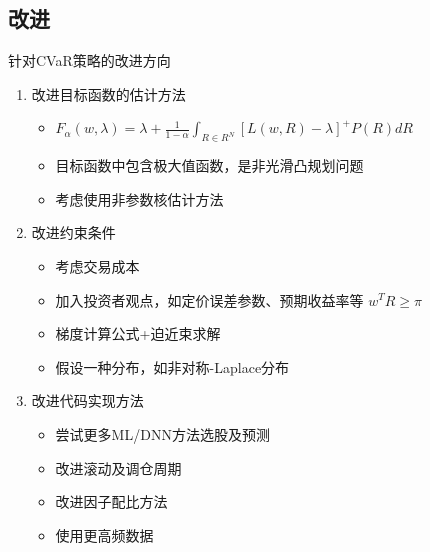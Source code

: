 \documentclass[CJK,aspectratio=43]{beamer}  %
\begin{document}
\subsection{改进}
\begin{frame}{针对CVaR策略的改进方向}
	\begin{enumerate}
		\item 改进目标函数的估计方法
		\begin{itemize}
			\item $F_{\alpha}(w,\lambda)=\lambda+\frac{1}{1-\alpha}\int_{R\in R^N}[L(w,R)-\lambda]^{+}P(R)dR$
			\item 目标函数中包含极大值函数，是非光滑凸规划问题
			\item 考虑使用非参数核估计方法~\cite{Huang2014}
		\end{itemize}
		\item 改进约束条件
		\begin{itemize}
			\item 考虑交易成本
			\item 加入投资者观点，如定价误差参数、预期收益率等 $w^TR\geq \pi$
			\item 梯度计算公式+迫近束求解~\cite{Tong2021}
			\item 假设一种分布，如非对称-Laplace分布~\cite{Huang2022}
		\end{itemize}
		\item  改进代码实现方法
		\begin{itemize}
			\item 尝试更多ML/DNN方法选股及预测
			\item 改进滚动及调仓周期
			\item 改进因子配比方法
			\item 使用更高频数据
		\end{itemize}
	\end{enumerate}
\end{frame}

\appendix
\end{document}

